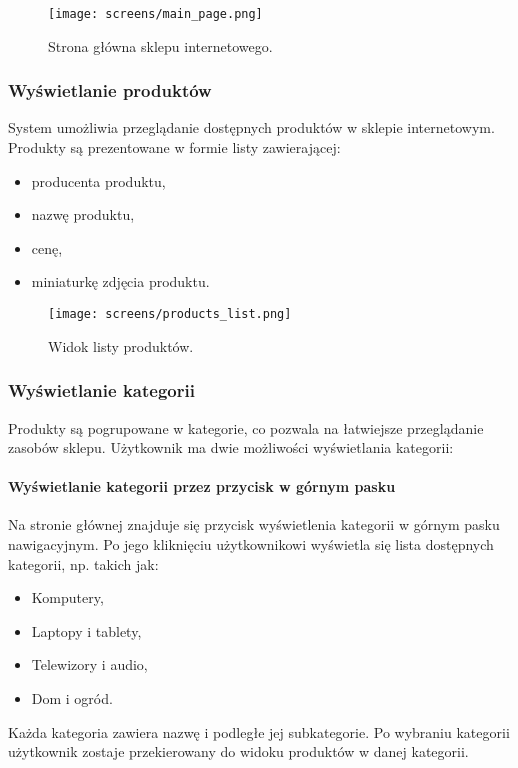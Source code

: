 \documentclass[12pt,a4paper,oneside]{article}
\theoremstyle{definition}
\numberwithin{equation}{section}
\begin{document}
\begin{figure}[H]
    \centering
    \texttt{[image: screens/main\_page.png]}
    \caption{Strona główna sklepu internetowego.}
    \label{fig:home_page}
\end{figure}






\newpage
\subsubsection{Wyświetlanie produktów}
System umożliwia przeglądanie dostępnych produktów w sklepie internetowym. Produkty są prezentowane w formie listy zawierającej:
\begin{itemize}
    \item producenta produktu,
    \item nazwę produktu,
    \item cenę,
    \item miniaturkę zdjęcia produktu.
\end{itemize}

\begin{figure}[H]
    \centering
    \texttt{[image: screens/products\_list.png]}
    \caption{Widok listy produktów.}
    \label{fig:product_list}
\end{figure}






\subsubsection{Wyświetlanie kategorii}
Produkty są pogrupowane w kategorie, co pozwala na łatwiejsze przeglądanie zasobów sklepu. Użytkownik ma dwie możliwości wyświetlania kategorii:

\paragraph{Wyświetlanie kategorii przez przycisk w górnym pasku}
Na stronie głównej znajduje się przycisk wyświetlenia kategorii w górnym pasku nawigacyjnym. Po jego kliknięciu użytkownikowi wyświetla się lista dostępnych kategorii, np. takich jak:
\begin{itemize}
    \item Komputery,
    \item Laptopy i tablety,
    \item Telewizory i audio,
    \item Dom i ogród.
\end{itemize}
Każda kategoria zawiera nazwę i podległe jej subkategorie. Po wybraniu kategorii użytkownik zostaje przekierowany do widoku produktów w danej kategorii.
\end{document}
